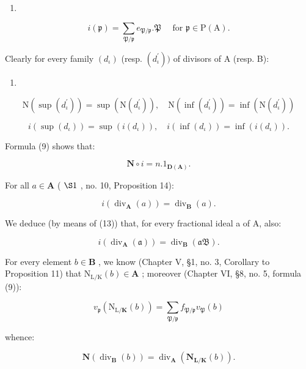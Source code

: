 \begin{enumerate}
\def\labelenumi{(\arabic{enumi})}
\setcounter{enumi}{10}
\tightlist
\item
\end{enumerate}

\[
i (\mathfrak {p}) = \sum_ {\mathfrak {P} / \mathfrak {p}} e _ {\mathfrak {P} / \mathfrak {p}}. \mathfrak {P} \quad \text {   for   } \mathfrak {p} \in \mathrm{P} (\mathrm{A}).
\]

Clearly for every family \((d_{\iota})\) (resp. \((d_{\iota}^{\prime}))\) of divisors of A (resp. B):

\begin{enumerate}
\def\labelenumi{(\arabic{enumi})}
\setcounter{enumi}{11}
\tightlist
\item
\end{enumerate}

\[
\mathrm{N} (\sup (d _ {\iota} ^ {\prime})) = \sup (\mathrm{N} (d _ {\iota} ^ {\prime})), \quad \mathrm{N} (\inf (d _ {\iota} ^ {\prime})) = \inf (\mathrm{N} (d _ {\iota} ^ {\prime}))\tag{13}
\]

\[
i \left(\sup (d _ {\iota})\right) = \sup (i (d _ {\iota})), \quad i (\inf (d _ {\iota})) = \inf (i (d _ {\iota})).
\]

Formula (9) shows that:

\[
\mathbf {N} \circ i = n. 1 _ {\mathbf {D} (\mathbf {A})}.\tag{14}
\]

For all \(a \in \mathbf{A}\) ( \(\S 1\) , no. 10, Proposition 14):

\[
i \left(\operatorname{div} _ {\mathbf {A}} (a)\right) = \operatorname{div} _ {\mathbf {B}} (a).\tag{15}
\]

We deduce (by means of (13)) that, for every fractional ideal a of A, also:

\[
i \left(\operatorname{div} _ {\mathbf {A}} (\mathfrak {a})\right) = \operatorname{div} _ {\mathbf {B}} (\mathfrak {a B}).\tag{16}
\]

For every element \(b \in \mathbf{B}\) , we know (Chapter V, §1, no. 3, Corollary to Proposition 11) that \(\mathrm{N}_{\mathrm{L / K}}(b) \in \mathbf{A}\) ; moreover (Chapter VI, §8, no. 5, formula (9)):

\[
v _ {\mathfrak {p}} \left(\mathrm{N} _ {\mathrm{L} / \mathbf {K}} (b)\right) = \sum_ {\mathfrak {P} / \mathfrak {p}} f _ {\mathfrak {P} / \mathfrak {p}} v _ {\mathfrak {P}} (b)\tag{17}
\]

whence:

\[
\mathbf {N} (\operatorname{div} _ {\mathbf {B}} (b)) = \operatorname{div} _ {\mathbf {A}} (\mathbf {N} _ {\mathbf {L} / \mathbf {K}} (b)).\tag{18}
\]

